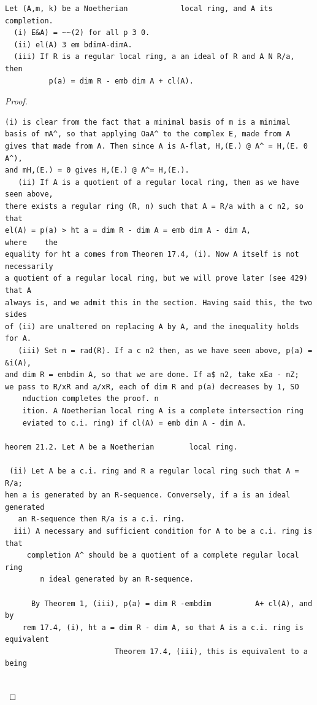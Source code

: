 \begin{theorem}\label{mcrt-auto-theorem-21-1}\uses{}
\begin{verbatim}
Let (A,m, k) be a Noetherian            local ring, and A its
completion.
  (i) E&A) = ~~(2) for all p 3 0.
  (ii) el(A) 3 em bdimA-dimA.
  (iii) If R is a regular local ring, a an ideal of R and A N R/a, then
          p(a) = dim R - emb dim A + cl(A).
\end{verbatim}
\end{theorem}
\begin{proof}
\begin{verbatim}
(i) is clear from the fact that a minimal basis of m is a minimal
basis of mA^, so that applying OaA^ to the complex E, made from A
gives that made from A. Then since A is A-flat, H,(E.) @ A^ = H,(E. 0 A^),
and mH,(E.) = 0 gives H,(E.) @ A^= H,(E.).
   (ii) If A is a quotient of a regular local ring, then as we have seen above,
there exists a regular ring (R, n) such that A = R/a with a c n2, so that
el(A) = p(a) > ht a = dim R - dim A = emb dim A - dim A,           where    the
equality for ht a comes from Theorem 17.4, (i). Now A itself is not necessarily
a quotient of a regular local ring, but we will prove later (see 429) that A
always is, and we admit this in the section. Having said this, the two sides
of (ii) are unaltered on replacing A by A, and the inequality holds for A.
   (iii) Set n = rad(R). If a c n2 then, as we have seen above, p(a) = &i(A),
and dim R = embdim A, so that we are done. If a$ n2, take xEa - nZ;
we pass to R/xR and a/xR, each of dim R and p(a) decreases by 1, SO
    nduction completes the proof. n
    ition. A Noetherian local ring A is a complete intersection ring
    eviated to c.i. ring) if cl(A) = emb dim A - dim A.

heorem 21.2. Let A be a Noetherian        local ring.

 (ii) Let A be a c.i. ring and R a regular local ring such that A = R/a;
hen a is generated by an R-sequence. Conversely, if a is an ideal generated
   an R-sequence then R/a is a c.i. ring.
  iii) A necessary and sufficient condition for A to be a c.i. ring is that
     completion A^ should be a quotient of a complete regular local ring
        n ideal generated by an R-sequence.

      By Theorem 1, (iii), p(a) = dim R -embdim          A+ cl(A), and by
    rem 17.4, (i), ht a = dim R - dim A, so that A is a c.i. ring is equivalent
                         Theorem 17.4, (iii), this is equivalent to a being


\end{verbatim}
\end{proof}
